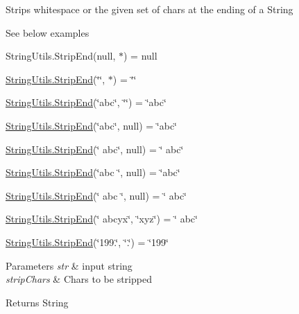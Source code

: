 Strips whitespace or the given set of chars at the ending of a String 

See below examples 

String\+Utils.\+Strip\+End(null, $\ast$) = null 

\hyperlink{class_ultimate_1_1_utilities_1_1_string_utils_a8f9c5b78990c3844ba523170d40ff453}{String\+Utils.\+Strip\+End}(\char`\"{}\char`\"{}, $\ast$) = \char`\"{}\char`\"{} 

\hyperlink{class_ultimate_1_1_utilities_1_1_string_utils_a8f9c5b78990c3844ba523170d40ff453}{String\+Utils.\+Strip\+End}(\char`\"{}abc\char`\"{}, \char`\"{}\char`\"{}) = \char`\"{}abc\char`\"{} 

\hyperlink{class_ultimate_1_1_utilities_1_1_string_utils_a8f9c5b78990c3844ba523170d40ff453}{String\+Utils.\+Strip\+End}(\char`\"{}abc\char`\"{}, null) = \char`\"{}abc\char`\"{} 

\hyperlink{class_ultimate_1_1_utilities_1_1_string_utils_a8f9c5b78990c3844ba523170d40ff453}{String\+Utils.\+Strip\+End}(\char`\"{}  abc\char`\"{}, null) = \char`\"{}  abc\char`\"{} 

\hyperlink{class_ultimate_1_1_utilities_1_1_string_utils_a8f9c5b78990c3844ba523170d40ff453}{String\+Utils.\+Strip\+End}(\char`\"{}abc  \char`\"{}, null) = \char`\"{}abc\char`\"{} 

\hyperlink{class_ultimate_1_1_utilities_1_1_string_utils_a8f9c5b78990c3844ba523170d40ff453}{String\+Utils.\+Strip\+End}(\char`\"{} abc \char`\"{}, null) = \char`\"{} abc\char`\"{} 

\hyperlink{class_ultimate_1_1_utilities_1_1_string_utils_a8f9c5b78990c3844ba523170d40ff453}{String\+Utils.\+Strip\+End}(\char`\"{}  abcyx\char`\"{}, \char`\"{}xyz\char`\"{}) = \char`\"{}  abc\char`\"{} 

\hyperlink{class_ultimate_1_1_utilities_1_1_string_utils_a8f9c5b78990c3844ba523170d40ff453}{String\+Utils.\+Strip\+End}(\char`\"{}199.\char`\"{}, \char`\"{}.\char`\"{}) = \char`\"{}199\char`\"{} 


\begin{DoxyParams}{Parameters}
{\em str} & input string\\
\hline
{\em strip\+Chars} & Chars to be stripped\\
\hline
\end{DoxyParams}
\begin{DoxyReturn}{Returns}
String
\end{DoxyReturn}

